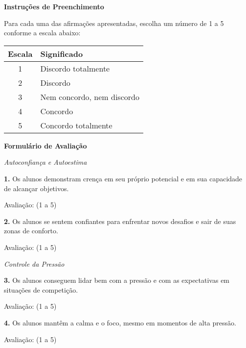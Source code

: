
\textbf{Instruções de Preenchimento}

Para cada uma das afirmações apresentadas, escolha um número de 1 a 5 conforme a escala abaixo:

\begin{center}
\begin{tabular}{|c|l|}
\hline
\textbf{Escala} & \textbf{Significado} \\
\hline
1 & Discordo totalmente \\
\hline
2 & Discordo \\
\hline
3 & Nem concordo, nem discordo \\
\hline
4 & Concordo \\
\hline
5 & Concordo totalmente \\
\hline
\end{tabular}
\end{center}

\textbf{Formulário de Avaliação}

\textit{Autoconfiança e Autoestima}

\textbf{1.} Os alunos demonstram crença em seu próprio potencial e em sua capacidade de alcançar objetivos.

Avaliação: \underline{\hspace{2cm}} (1 a 5)

\textbf{2.} Os alunos se sentem confiantes para enfrentar novos desafios e sair de suas zonas de conforto.

Avaliação: \underline{\hspace{2cm}} (1 a 5)

\textit{Controle da Pressão}

\textbf{3.} Os alunos conseguem lidar bem com a pressão e com as expectativas em situações de competição.

Avaliação: \underline{\hspace{2cm}} (1 a 5)

\textbf{4.} Os alunos mantêm a calma e o foco, mesmo em momentos de alta pressão.

Avaliação: \underline{\hspace{2cm}} (1 a 5)

